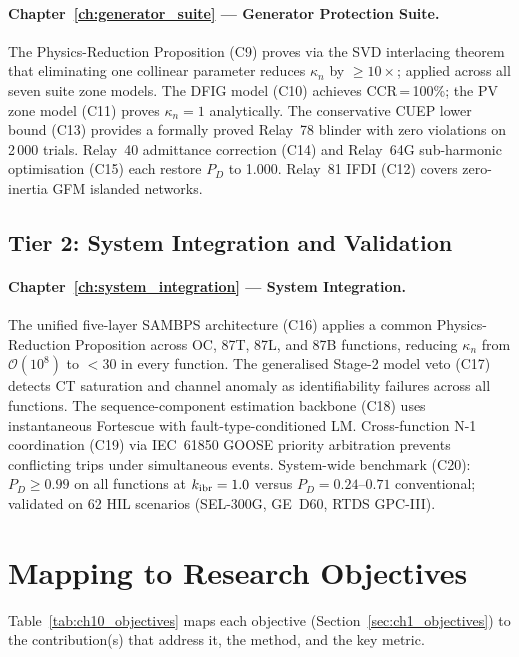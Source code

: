 \paragraph{Chapter~\ref{ch:generator_suite} — Generator Protection Suite.}
The Physics-Reduction Proposition (C9) proves via the SVD interlacing theorem
that eliminating one collinear parameter reduces $\kappa_n$ by $\geq 10\times$;
applied across all seven suite zone models. The DFIG model (C10) achieves
CCR\,=\,100\%; the PV zone model (C11) proves $\kappa_n = 1$ analytically.
The conservative CUEP lower bound (C13) provides a formally proved Relay~78
blinder with zero violations on 2\,000 trials. Relay~40 admittance correction
(C14) and Relay~64G sub-harmonic optimisation (C15) each restore $P_D$ to
1.000. Relay~81 IFDI (C12) covers zero-inertia GFM islanded networks.

\subsection{Tier 2: System Integration and Validation}

\paragraph{Chapter~\ref{ch:system_integration} — System Integration.}
The unified five-layer SAMBPS architecture (C16) applies a common
Physics-Reduction Proposition across OC, 87T, 87L, and 87B functions,
reducing $\kappa_n$ from $\mathcal{O}(10^8)$ to $< 30$ in every function.
The generalised Stage-2 model veto (C17) detects CT saturation and channel
anomaly as identifiability failures across all functions. The
sequence-component estimation backbone (C18) uses instantaneous Fortescue
with fault-type-conditioned LM. Cross-function N-1 coordination (C19) via
IEC~61850 GOOSE priority arbitration prevents conflicting trips under
simultaneous events. System-wide benchmark (C20): $P_D \geq 0.99$ on all
functions at $k_{\rm ibr} = 1.0$ versus $P_D = 0.24$--$0.71$ conventional;
validated on 62 HIL scenarios (SEL-300G, GE~D60, RTDS GPC-III).

\section{Mapping to Research Objectives}
\label{sec:ch10_objectives}

Table~\ref{tab:ch10_objectives} maps each objective (Section~\ref{sec:ch1_objectives})
to the contribution(s) that address it, the method, and the key metric.

